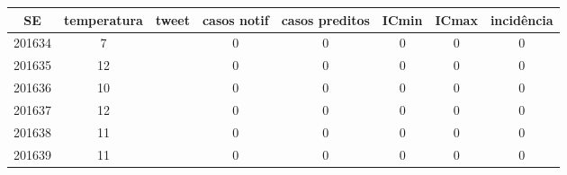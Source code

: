 \begin{tabular}{c|ccccccc}
  \hline
SE & temperatura & tweet & casos notif & casos preditos & ICmin & ICmax & incidência \\ 
  \hline
201634 & 7 &  & 0 & 0 & 0 & 0 & 0 \\ 
  201635 & 12 &  & 0 & 0 & 0 & 0 & 0 \\ 
  201636 & 10 &  & 0 & 0 & 0 & 0 & 0 \\ 
  201637 & 12 &  & 0 & 0 & 0 & 0 & 0 \\ 
  201638 & 11 &  & 0 & 0 & 0 & 0 & 0 \\ 
  201639 & 11 &  & 0 & 0 & 0 & 0 & 0 \\ 
   \hline
\end{tabular}

